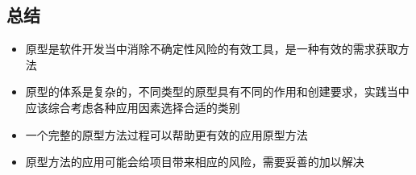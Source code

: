 \subsection{总结}
\begin{itemize}
    \item 原型是软件开发当中消除不确定性风险的有效工具，是一种有效的需求获取方法
    \item 原型的体系是复杂的，不同类型的原型具有不同的作用和创建要求，实践当中应该综合考虑各种应用因素选择合适的类别
    \item 一个完整的原型方法过程可以帮助更有效的应用原型方法
    \item 原型方法的应用可能会给项目带来相应的风险，需要妥善的加以解决
\end{itemize}
